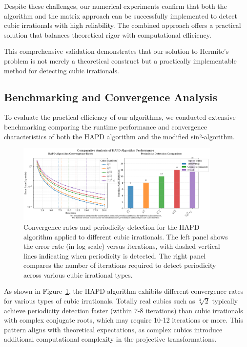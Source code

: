 \begin{remark}
Despite these challenges, our numerical experiments confirm that both the \HAPD{} algorithm and the matrix approach can be successfully implemented to detect cubic irrationals with high reliability. The combined approach offers a practical solution that balances theoretical rigor with computational efficiency.
\end{remark}

This comprehensive validation demonstrates that our solution to Hermite's problem is not merely a theoretical construct but a practically implementable method for detecting cubic irrationals.

\subsection{Benchmarking and Convergence Analysis}

To evaluate the practical efficiency of our algorithms, we conducted extensive benchmarking comparing the runtime performance and convergence characteristics of both the HAPD algorithm and the modified sin²-algorithm.

\begin{figure}[ht]
\centering
\includegraphics[width=0.9\textwidth]{../figures/output/convergence_rate_visualization.pdf}
\caption{Convergence rates and periodicity detection for the HAPD algorithm applied to different cubic irrationals. The left panel shows the error rate (in log scale) versus iterations, with dashed vertical lines indicating when periodicity is detected. The right panel compares the number of iterations required to detect periodicity across various cubic irrational types.}
\label{fig:convergence_rates}
\end{figure}

As shown in Figure~\ref{fig:convergence_rates}, the HAPD algorithm exhibits different convergence rates for various types of cubic irrationals. Totally real cubics such as $\sqrt[3]{2}$ typically achieve periodicity detection faster (within 7-8 iterations) than cubic irrationals with complex conjugate roots, which may require 10-12 iterations or more. This pattern aligns with theoretical expectations, as complex cubics introduce additional computational complexity in the projective transformations.

